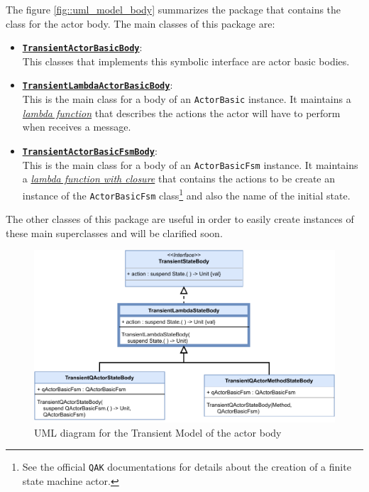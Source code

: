 The figure \ref{fig::uml_model_body} summarizes the package that contains the class for the actor body. The main classes of this package are:

\begin{itemize}
	\item 	\href{https://github.com/LM-96/QA-Extensions/blob/main/it.unibo.qakactor/src/main/kotlin/model/actorbody/TransientActorBasicBody.kt}{\underline{\textbf{\texttt{TransientActorBasicBody}}}}:\\
	This classes that implements this symbolic interface are actor basic bodies.
	
	\item 	\href{https://github.com/LM-96/QA-Extensions/blob/main/it.unibo.qakactor/src/main/kotlin/model/actorbody/TransientLambdaActorBasicBody.kt}{\underline{\textbf{\texttt{TransientLambdaActorBasicBody}}}}:\\
	This is the main class for a body of an \texttt{ActorBasic} instance. It maintains a \href{https://kotlinlang.org/docs/lambdas.html}{\textit{lambda function}} that describes the actions the actor will have to perform when receives a message.
	
	\item 	\href{https://github.com/LM-96/QA-Extensions/blob/main/it.unibo.qakactor/src/main/kotlin/model/actorbody/TransientActorBasicFsmBody.kt}{\underline{\textbf{\texttt{TransientActorBasicFsmBody}}}}:\\
	This is the main class for a body of an \texttt{ActorBasicFsm} instance. It maintains a \href{https://kotlinlang.org/docs/lambdas.html#closures}{\textit{lambda function with closure}} that contains the actions to be create an instance of the \texttt{ActorBasicFsm} class\footnote{See the official \texttt{QAK} documentations for details about the creation of a finite state machine actor.} and also the name of the initial state.
\end{itemize}

The other classes of this package are useful in order to easily create instances of these main superclasses and will be clarified soon.

\begin{figure}[h]
	\centering
	\includegraphics[width=\textwidth]{img/[UML]it.unibo.kaktor.model.actorbody_onlystatebody}
	\caption{UML diagram for the Transient Model of the actor body}
	\label{fig::uml_model_state_body}
\end{figure}

